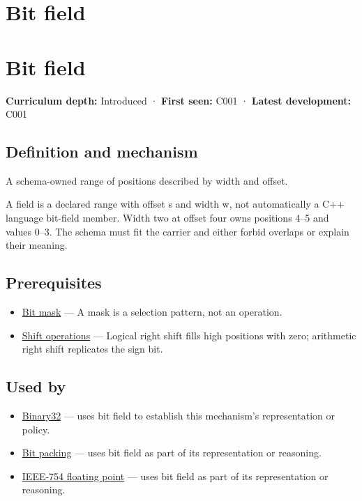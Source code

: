 \hypertarget{appendix-ac697f5c66e8}{}
\section*{Bit field}
\section{Bit field}\label{bit-field}

\textbf{Curriculum depth:} Introduced · \textbf{First seen:} C001 · \textbf{Latest development:} C001

\subsection{Definition and mechanism}\label{definition-and-mechanism}

A schema-owned range of positions described by width and offset.

A field is a declared range with offset s and width w, not automatically a C++ language bit-field member. Width two at offset four owns positions 4--5 and values 0--3. The schema must fit the carrier and either forbid overlaps or explain their meaning.

\subsection{Prerequisites}\label{prerequisites}

\begin{itemize}
\tightlist
\item
  \hyperref[appendix-dbe5905163c2]{Bit mask} --- A mask is a selection pattern, not an operation.
\item
  \hyperref[appendix-73425b25118e]{Shift operations} --- Logical right shift fills high positions with zero; arithmetic right shift replicates the sign bit.
\end{itemize}

\subsection{Used by}\label{used-by}

\begin{itemize}
\item
  \hyperref[appendix-5057f9ad327f]{Binary32} --- uses bit field to establish this mechanism's representation or policy.
\item
  \hyperref[appendix-1f9963e1a5d1]{Bit packing} --- uses bit field as part of its representation or reasoning.
\item
  \hyperref[appendix-343615f49ddf]{IEEE-754 floating point} --- uses bit field as part of its representation or reasoning.
\end{itemize}

